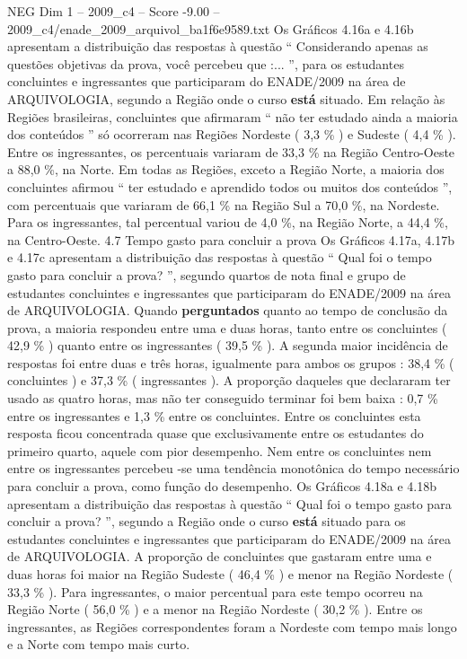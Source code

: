 \begin{textsample}{NEG Dim 1 – 2009\_c4 – Score -9.00 – 2009\_c4/enade\_2009\_arquivol\_ba1f6e9589.txt}
Os Gráficos 4.16a e 4.16b apresentam a distribuição das respostas à questão “ Considerando apenas as questões objetivas da prova, você percebeu que :... ”, para os estudantes concluintes e ingressantes que participaram do ENADE/2009 na área de ARQUIVOLOGIA, segundo a Região onde o curso \textbf{está} situado.
Em relação às Regiões brasileiras, concluintes que afirmaram “ não ter estudado ainda a maioria dos conteúdos ” só ocorreram nas Regiões Nordeste ( 3,3 \% ) e Sudeste ( 4,4 \% ).
Entre os ingressantes, os percentuais variaram de 33,3 \% na Região Centro-Oeste a 88,0 \%, na Norte.
Em todas as Regiões, exceto a Região Norte, a maioria dos concluintes afirmou “ ter estudado e aprendido todos ou muitos dos conteúdos ”, com percentuais que variaram de 66,1 \% na Região Sul a 70,0 \%, na Nordeste.
Para os ingressantes, tal percentual variou de 4,0 \%, na Região Norte, a 44,4 \%, na Centro-Oeste. 4.7 Tempo gasto para concluir a prova Os Gráficos 4.17a, 4.17b e 4.17c apresentam a distribuição das respostas à questão “ Qual foi o tempo gasto para concluir a prova? ”, segundo quartos de nota final e grupo de estudantes concluintes e ingressantes que participaram do ENADE/2009 na área de ARQUIVOLOGIA.
Quando \textbf{perguntados} quanto ao tempo de conclusão da prova, a maioria respondeu entre uma e duas horas, tanto entre os concluintes ( 42,9 \% ) quanto entre os ingressantes ( 39,5 \% ).
A segunda maior incidência de respostas foi entre duas e três horas, igualmente para ambos os grupos : 38,4 \% ( concluintes ) e 37,3 \% ( ingressantes ).
A proporção daqueles que declararam ter usado as quatro horas, mas não ter conseguido terminar foi bem baixa : 0,7 \% entre os ingressantes e 1,3 \% entre os concluintes.
Entre os concluintes esta resposta ficou concentrada quase que exclusivamente entre os estudantes do primeiro quarto, aquele com pior desempenho.
Nem entre os concluintes nem entre os ingressantes percebeu -se uma tendência monotônica do tempo necessário para concluir a prova, como função do desempenho.
Os Gráficos 4.18a e 4.18b apresentam a distribuição das respostas à questão “ Qual foi o tempo gasto para concluir a prova? ”, segundo a Região onde o curso \textbf{está} situado para os estudantes concluintes e ingressantes que participaram do ENADE/2009 na área de ARQUIVOLOGIA.
A proporção de concluintes que gastaram entre uma e duas horas foi maior na Região Sudeste ( 46,4 \% ) e menor na Região Nordeste ( 33,3 \% ).
Para ingressantes, o maior percentual para este tempo ocorreu na Região Norte ( 56,0 \% ) e a menor na Região Nordeste ( 30,2 \% ).
Entre os ingressantes, as Regiões correspondentes foram a Nordeste com tempo mais longo e a Norte com tempo mais curto.

\end{textsample}
